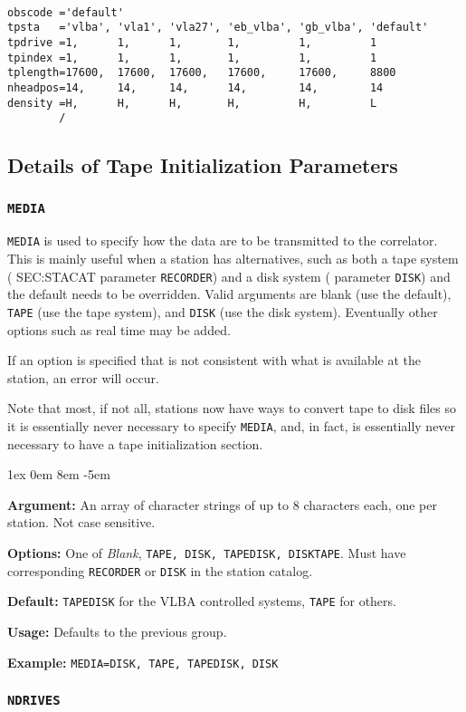 \documentclass{report}
\newcommand{\rcwbox}[5]{
  \begin{list}{}{\parsep 1ex  \itemsep 0em
                 \leftmargin 8em  \itemindent -5em }
    \item {\bf Argument:} #1
    \item {\bf Options:}  #2
    \item {\bf Default:}  #3
    \item {\bf Usage:}    #4
    \item {\bf Example:}  #5
  \end{list}
}
\begin{document}
\begin{verbatim}

obscode ='default'
tpsta   ='vlba', 'vla1', 'vla27', 'eb_vlba', 'gb_vlba', 'default'
tpdrive =1,      1,      1,       1,         1,         1
tpindex =1,      1,      1,       1,         1,         1
tplength=17600,  17600,  17600,   17600,     17600,     8800
nheadpos=14,     14,     14,      14,        14,        14
density =H,      H,      H,       H,         H,         L
        /

\end{verbatim}

\subsection{Details of Tape Initialization Parameters}

\subsubsection{\label{TP:MEDIA}{\tt MEDIA}}

{\tt MEDIA} is used to specify how the data are to be transmitted to
the correlator.  This is mainly useful when a station has
alternatives, such as both a tape system (
{SEC:STACAT} parameter {\tt RECORDER}) and a disk system
( parameter {\tt DISK}) and the
default needs to be overridden.  Valid arguments are blank (use the
default), {\tt TAPE} (use the tape system), and {\tt DISK} (use the
disk system).  Eventually other options such as real time may be
added.

If an option is specified that is not consistent with what is available
at the station, an error will occur.

Note that most, if not all, stations now have ways to convert tape to
disk files so it is essentially never necessary to specify {\tt MEDIA},
and, in fact, is essentially never necessary to have a tape initialization
section.


\rcwbox
{An array of character strings of up to 8 characters each, one per
station.  Not case sensitive.}
{One of {\sl Blank}, {\tt TAPE, DISK, TAPEDISK, DISKTAPE}.  Must
have corresponding {\tt RECORDER} or {\tt DISK} in the station
catalog.}
{{\tt TAPEDISK} for the VLBA controlled systems, {\tt TAPE} for others.}
{Defaults to the previous group.}
{{\tt MEDIA=DISK, TAPE, TAPEDISK, DISK}}


\subsubsection{\label{TP:NDRIVES}{\tt NDRIVES}}
\end{document}
